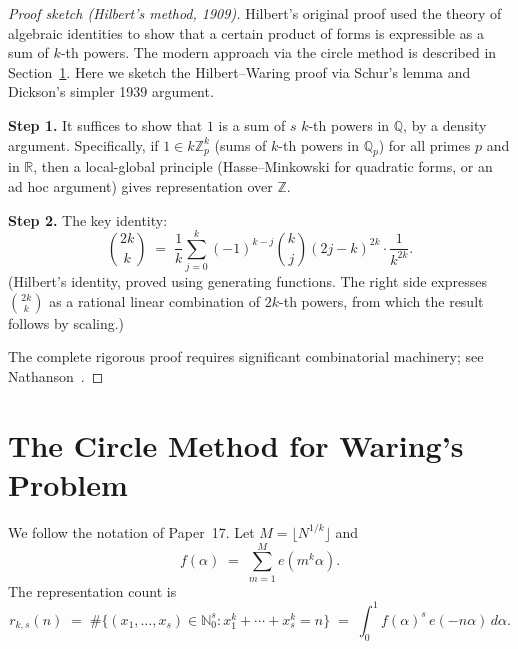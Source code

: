 \documentclass[12pt,a4paper]{amsart}
\theoremstyle{definition}
\newcommand{\N}{\mathbb{N}}
\newcommand{\Z}{\mathbb{Z}}
\newcommand{\Q}{\mathbb{Q}}
\newcommand{\R}{\mathbb{R}}
\newcommand{\eq}[1]{e\!\left(#1\right)}
\begin{document}
\begin{proof}[Proof sketch (Hilbert's method, 1909)]
  Hilbert's original proof used the theory of algebraic identities to show
  that a certain product of forms is expressible as a sum of $k$-th powers.
  The modern approach via the circle method is described in Section~\ref{sec:circle}.
  Here we sketch the Hilbert--Waring proof via Schur's lemma and Dickson's
  simpler 1939 argument.

  \textbf{Step 1.} It suffices to show that $1$ is a sum of $s$ $k$-th powers
  in $\Q$, by a density argument.  Specifically, if $1 \in k\Z_p^k$ (sums
  of $k$-th powers in $\Q_p$) for all primes $p$ and in $\R$, then a local-global
  principle (Hasse--Minkowski for quadratic forms, or an ad hoc argument) gives
  representation over $\Z$.

  \textbf{Step 2.} The key identity:
  \[
    \binom{2k}{k} \;=\; \frac{1}{k} \sum_{j=0}^{k}
    (-1)^{k-j} \binom{k}{j} (2j - k)^{2k}
    \cdot \frac{1}{k^{2k}}.
  \]
  (Hilbert's identity, proved using generating functions.  The right
  side expresses $\binom{2k}{k}$ as a rational linear combination of
  $2k$-th powers, from which the result follows by scaling.)

  The complete rigorous proof requires significant combinatorial machinery;
  see Nathanson~\cite[Chapter~7]{Nathanson1996}.
\end{proof}

\section{The Circle Method for Waring's Problem}
\label{sec:circle}

We follow the notation of Paper~17.  Let $M = \lfloor N^{1/k} \rfloor$ and
\[
  f(\alpha) \;=\; \sum_{m=1}^{M} \eq{m^k \alpha}.
\]
The representation count is
\[
  r_{k,s}(n) \;=\; \#\bigl\{(x_1,\ldots,x_s) \in \N_0^s :
                       x_1^k + \cdots + x_s^k = n\bigr\}
  \;=\; \int_0^1 f(\alpha)^s\, \eq{-n\alpha}\, d\alpha.
\]
\end{document}
